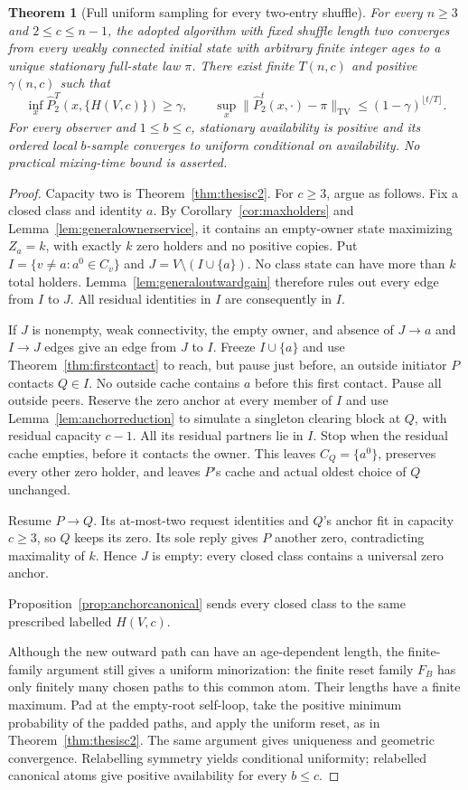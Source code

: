 \documentclass[11pt]{article}
\newtheorem{theorem}{Theorem}
\newcommand{\TV}{\mathrm{TV}}
\begin{document}
\begin{theorem}[Full uniform sampling for every two-entry shuffle]
\label{thm:thesisgeneraltwo}
For every $n\ge3$ and $2\le c\le n-1$, the adopted
algorithm with fixed shuffle length two converges
from every weakly connected initial state with
arbitrary finite integer ages to a unique stationary
full-state law $\pi$. There exist finite $T(n,c)$
and positive $\gamma(n,c)$ such that
\[
 \inf_x\widehat P_2^T(x,\{H(V,c)\})\ge\gamma,
 \qquad
 \sup_x\|\widehat P_2^t(x,\cdot)-\pi\|_{\TV}
       \le(1-\gamma)^{\lfloor t/T\rfloor}.
\]
For every observer and $1\le b\le c$, stationary
availability is positive and its ordered local
$b$-sample converges to uniform conditional on availability.
No practical mixing-time bound is asserted.
\end{theorem}
\begin{proof}
Capacity two is Theorem~\ref{thm:thesisc2}.
For $c\ge3$, argue as follows.
Fix a closed class and identity $a$. By
Corollary~\ref{cor:maxholders} and
Lemma~\ref{lem:generalownerservice}, it contains an
empty-owner state maximizing $Z_a=k$, with exactly $k$
zero holders and no positive copies. Put
$I=\{v\ne a:a^0\in C_v\}$ and
$J=V\setminus(I\cup\{a\})$. No class state can have
more than $k$ total holders. Lemma~\ref{lem:generaloutwardgain}
therefore rules out every edge from $I$ to $J$.
All residual identities in $I$ are consequently in $I$.

If $J$ is nonempty, weak connectivity, the empty owner,
and absence of $J\to a$ and $I\to J$ edges give an
edge from $J$ to $I$. Freeze $I\cup\{a\}$ and use
Theorem~\ref{thm:firstcontact} to reach, but pause just
before, an outside initiator $P$ contacts $Q\in I$.
No outside cache contains $a$ before this first contact.
Pause all outside peers. Reserve the zero anchor at
every member of $I$ and use
Lemma~\ref{lem:anchorreduction} to simulate a
singleton clearing block at $Q$, with residual capacity
$c-1$. All its residual partners lie in $I$.
Stop when the residual cache empties, before it contacts
the owner. This leaves $C_Q=\{a^0\}$, preserves every
other zero holder, and leaves $P$'s cache and actual
oldest choice of $Q$ unchanged.

Resume $P\to Q$. Its at-most-two request identities
and $Q$'s anchor fit in capacity $c\ge3$, so $Q$
keeps its zero. Its sole reply gives $P$ another zero,
contradicting maximality of $k$. Hence $J$ is empty:
every closed class contains a universal zero anchor.

Proposition~\ref{prop:anchorcanonical} sends every closed class to
the same prescribed labelled $H(V,c)$.

Although the new outward path can have an
age-dependent length, the finite-family argument
still gives a uniform minorization: the finite reset
family $F_B$ has only finitely many chosen paths to
this common atom. Their lengths have a finite maximum. Pad at the
empty-root self-loop, take the positive minimum probability
of the padded paths, and apply the uniform reset,
as in Theorem~\ref{thm:thesisc2}. The same argument
gives uniqueness and geometric convergence.
Relabelling symmetry yields conditional uniformity;
relabelled canonical atoms give positive availability
for every $b\le c$.
\end{proof}
\end{document}
